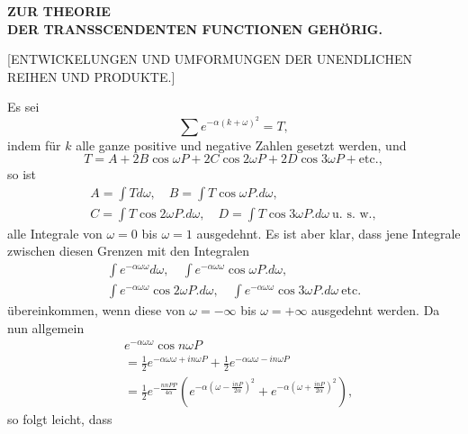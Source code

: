 \begingroup
\makeatletter\tagsleft@true\let\veqno\@@leqno\makeatother
\NoSourceHead
{}
\begin{center}\large\bfseries ZUR THEORIE\\[.6em]DER TRANSSCENDENTEN FUNCTIONEN GEHÖRIG.\end{center}
\begin{center}\large [ENTWICKELUNGEN UND UMFORMUNGEN DER UNENDLICHEN\\ REIHEN UND PRODUKTE.]\end{center}
\noindent {\small[S. 40]}\par
\par\indent Es sei
\[\sum e^{-\alpha(k+\omega)^2}=T,\]
\noindent indem für $k$ alle ganze positive und negative Zahlen gesetzt werden, und
\[T=A+2B\cos\omega P+2C\cos2\omega P+2D\cos3\omega P+\text{etc.},\]
\noindent so ist
\[\begin{gathered}
A=\int T d\omega,\quad B=\int T\cos\omega P.d\omega,\\
C=\int T\cos2\omega P.d\omega,\quad D=\int T\cos3\omega P.d\omega\ \text{u. s. w.},
\end{gathered}\]
\noindent alle Integrale von $\omega=0$ bis $\omega=1$ ausgedehnt. Es ist aber klar, dass jene Integrale zwischen diesen Grenzen mit den Integralen
\[\begin{gathered}
\int e^{-\alpha\omega\omega}d\omega,\quad\int e^{-\alpha\omega\omega}\cos\omega P.d\omega,\\
\int e^{-\alpha\omega\omega}\cos2\omega P.d\omega,\quad\int e^{-\alpha\omega\omega}\cos3\omega P.d\omega\ \text{etc.}
\end{gathered}\]
\noindent übereinkommen, wenn diese von $\omega=-\infty$ bis $\omega=+\infty$ ausgedehnt werden. Da nun allgemein
\clearpage
{}
\[\begin{aligned}
&e^{-\alpha\omega\omega}\cos n\omega P\\
&=\tfrac12e^{-\alpha\omega\omega+in\omega P}+\tfrac12e^{-\alpha\omega\omega-in\omega P}\\
&=\tfrac12e^{-\frac{nnPP}{4\alpha}}\left(e^{-\alpha\left(\omega-\frac{inP}{2\alpha}\right)^2}+e^{-\alpha\left(\omega+\frac{inP}{2\alpha}\right)^2}\right),
\end{aligned}\]
\noindent so folgt leicht, dass
